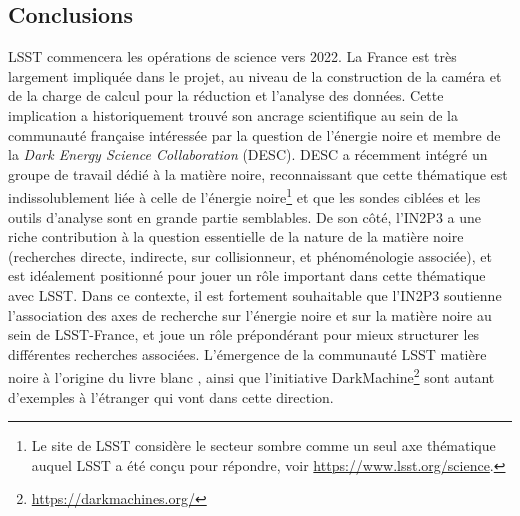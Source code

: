 \documentclass[12pt]{article}
\begin{document}
\vspace{-1em} \subsection*{Conclusions} \vspace{-0.5em}

LSST commencera les opérations de science vers 2022. La France est très largement impliquée dans le projet, au niveau de la construction de la caméra et de la charge de calcul pour la réduction et l'analyse des données. Cette implication a historiquement trouvé son ancrage scientifique au sein de la communauté française intéressée par la question de l'énergie noire et membre de la {\it Dark Energy Science Collaboration} (DESC). DESC a récemment intégré un groupe de travail dédié à la matière noire, reconnaissant que cette thématique est indissolublement liée à celle de l'énergie noire\footnote{Le site de LSST considère le secteur sombre comme un seul axe thématique auquel LSST a été conçu pour répondre, voir \href{https://www.lsst.org/science}{https://www.lsst.org/science}. } et que les sondes ciblées et les outils d'analyse sont en grande partie semblables.
De son côté, l'IN2P3 a une riche contribution à la question essentielle de la nature de la matière noire (recherches directe, indirecte, sur collisionneur, et phénoménologie associée), et est idéalement positionné pour jouer un rôle important dans cette thématique avec LSST. Dans ce contexte, il est fortement souhaitable que l'IN2P3 soutienne l’association des axes de recherche sur l’énergie noire et sur la matière noire au sein de LSST-France, et joue un rôle prépondérant pour mieux structurer les différentes recherches associées. L'émergence de la communauté LSST matière noire à l'origine du livre blanc \citep{drlica-wagner_2019_lsst_dark_matter}, ainsi que l'initiative {\sc DarkMachine}\footnote{\href{https://darkmachines.org/}{https://darkmachines.org/}} sont autant d'exemples à l'étranger qui vont dans cette direction. 





\def\bibname{References}
\begingroup
  \small
  \setlength{\bibsep}{0pt plus 0.5ex}
  
  
\endgroup

\end{document}
